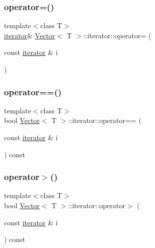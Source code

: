 \mbox{\label{classVector_1_1iterator_a872f28a0c1c29c65ff093a11723fb1a0_a872f28a0c1c29c65ff093a11723fb1a0}} 
\subsubsection{\texorpdfstring{operator=()}{operator=()}}
{\footnotesize\ttfamily template$<$class T$>$ \\
\hyperlink{classVector_1_1iterator}{iterator}\& \hyperlink{classVector}{Vector}$<$ T $>$\+::iterator\+::operator= (\begin{DoxyParamCaption}\item[{const \hyperlink{classVector_1_1iterator}{iterator} \&}]{i }\end{DoxyParamCaption})\hspace{0.3cm}{\ttfamily [inline]}}

\mbox{\label{classVector_1_1iterator_a105d376582ed6fdbf2e645f95a3b26df_a105d376582ed6fdbf2e645f95a3b26df}} 
\subsubsection{\texorpdfstring{operator==()}{operator==()}}
{\footnotesize\ttfamily template$<$class T$>$ \\
bool \hyperlink{classVector}{Vector}$<$ T $>$\+::iterator\+::operator== (\begin{DoxyParamCaption}\item[{const \hyperlink{classVector_1_1iterator}{iterator} \&}]{i }\end{DoxyParamCaption}) const\hspace{0.3cm}{\ttfamily [inline]}}

\mbox{\label{classVector_1_1iterator_a1136d388a7615e1b924ae5e30db1e420_a1136d388a7615e1b924ae5e30db1e420}} 
\subsubsection{\texorpdfstring{operator$>$()}{operator>()}}
{\footnotesize\ttfamily template$<$class T$>$ \\
bool \hyperlink{classVector}{Vector}$<$ T $>$\+::iterator\+::operator$>$ (\begin{DoxyParamCaption}\item[{const \hyperlink{classVector_1_1iterator}{iterator} \&}]{i }\end{DoxyParamCaption}) const\hspace{0.3cm}{\ttfamily [inline]}}

